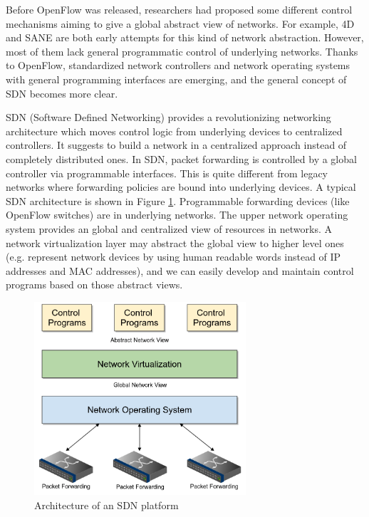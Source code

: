\documentclass[english]{tktltiki}
\begin{document}
Before OpenFlow was released, researchers had proposed some different control mechanisms aiming to give a global abstract view of networks. For example, 4D \cite{ghm+05} and SANE \cite{cfp+07} are both early attempts for this kind of network abstraction. However, most of them lack general programmatic control of underlying networks. Thanks to OpenFlow, standardized network controllers and network operating systems with general programming interfaces are emerging, and the general concept of SDN becomes more clear.

SDN (Software Defined Networking) provides a revolutionizing networking architecture which moves control logic from underlying devices to centralized controllers. It suggests to build a network in a centralized approach instead of completely distributed ones. In SDN, packet forwarding is controlled by a global controller via programmable interfaces. This is quite different from legacy networks where forwarding policies are bound into underlying devices. A typical SDN architecture is shown in Figure \ref{fig:sdn}. Programmable forwarding devices (like OpenFlow switches) are in underlying networks. The upper network operating system provides an global and centralized view of resources in networks. A network virtualization layer may abstract the global view to higher level ones (e.g. represent network devices by using human readable words instead of IP addresses and MAC addresses), and we can easily develop and maintain control programs based on those abstract views.

\begin{figure}[htbp]
  \centering
  \includegraphics[width=0.7\textwidth]{images/sdn.png}
  \caption{Architecture of an SDN platform}
  \label{fig:sdn}
\end{figure}
\end{document}
